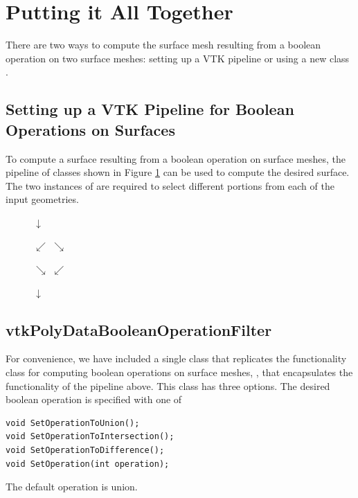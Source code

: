 \documentclass{InsightArticle}
\begin{document}
\section{Putting it All Together}

There are two ways to compute the surface mesh resulting from a boolean operation on two surface meshes: setting up a VTK pipeline or using a new class .

\subsection{Setting up a VTK Pipeline for Boolean Operations on Surfaces}

To compute a surface resulting from a boolean operation on surface meshes, the pipeline of classes shown in Figure \ref{fig:Pipeline} can be used to compute the desired surface. The two instances of  are required to select different portions from each of the input geometries.

\begin{figure}[h]
\begin{center}

$\downarrow$


$\swarrow$ \hspace{3em} $\searrow$

 \hspace{1em} 

$\searrow$ \hspace{3em} $\swarrow$


$\downarrow$

\end{center}
\label{fig:Pipeline}
\end{figure}

\subsection{vtkPolyDataBooleanOperationFilter}

For convenience, we have included a single class that replicates the functionality  class for computing boolean operations on surface meshes, , that encapsulates the functionality of the pipeline above. This class has three options. The desired boolean operation is specified with one of
\begin{verbatim}
void SetOperationToUnion();
void SetOperationToIntersection();
void SetOperationToDifference();
void SetOperation(int operation);
\end{verbatim}
The default operation is union.
\end{document}
